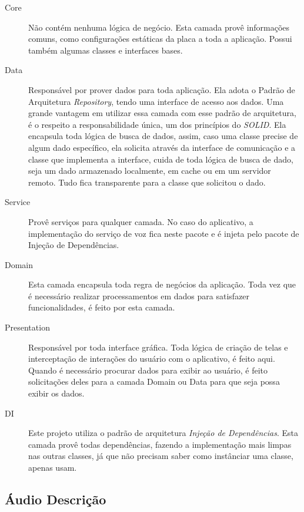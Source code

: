 \documentclass[
	12pt,				%
	oneside,			%
	a4paper,			%
	brazil				%
]{abntex2}
\begin{document}
\begin{description}

\item[Core] Não contém nenhuma lógica de negócio. Esta camada provê informações comuns, como configurações estáticas da placa a toda a aplicação. Possui também algumas classes e interfaces bases.

\item[Data] Responsável por prover dados para toda aplicação. Ela adota o Padrão de Arquitetura \textit{Repository}, tendo uma interface de acesso aos dados. Uma grande vantagem em utilizar essa camada com esse padrão de arquitetura, é o respeito a responsabilidade única, um dos princípios do \textit{SOLID}. Ela encapsula toda lógica de busca de dados, assim, caso uma classe precise de algum dado específico, ela solicita através da interface de comunicação e a classe que implementa a interface, cuida de toda lógica de busca de dado, seja um dado armazenado localmente, em cache ou em um servidor remoto. Tudo fica transparente para a classe que solicitou o dado.

\item[Service] Provê serviços para qualquer camada. No caso do aplicativo, a implementação do serviço de voz fica neste pacote e é injeta pelo pacote de Injeção de Dependências.

\item[Domain] Esta camada encapsula toda regra de negócios da aplicação. Toda vez que é necessário realizar processamentos em dados para satisfazer funcionalidades, é feito por esta camada.

\item[Presentation] Responsável por toda interface gráfica. Toda lógica de criação de telas e interceptação de interações do usuário com o aplicativo, é feito aqui. Quando é necessário procurar dados para exibir ao usuário, é feito solicitações deles para a camada Domain ou Data para que seja possa exibir os dados.

\item[DI] Este projeto utiliza o padrão de arquitetura \textit{Injeção de Dependências}. Esta camada provê todas dependências, fazendo a implementação mais limpas nas outras classes, já que não precisam saber como instânciar uma classe, apenas usam.
 
\end{description}

\subsection{Áudio Descrição}
\end{document}
